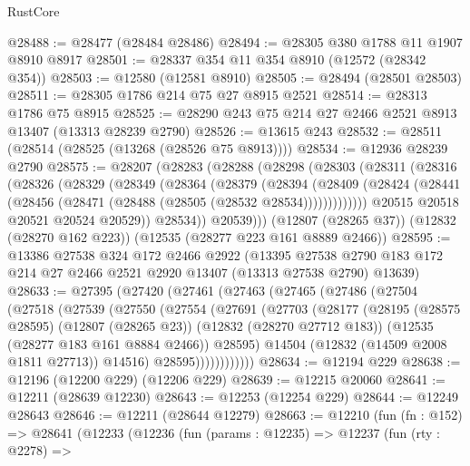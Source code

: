 \begin{lexlean}{RustCore}
\begin{coremodule}
@28488 := @28477 (@28484 @28486)
@28494 := @28305 @380 @1788 @11 @1907 @8910 @8917
@28501 := @28337 @354 @11 @354 @8910 (@12572 (@28342 @354))
@28503 := @12580 (@12581 @8910)
@28505 := @28494 (@28501 @28503)
@28511 := @28305 @1786 @214 @75 @27 @8915 @2521
@28514 := @28313 @1786 @75 @8915
@28525 := @28290 @243 @75 @214 @27 @2466 @2521 @8913 @13407 (@13313 @28239 @2790)
@28526 := @13615 @243
@28532 := @28511 (@28514 (@28525 (@13268 (@28526 @75 @8913))))
@28534 := @12936 @28239 @2790
@28575 := @28207
    (@28283
      (@28288
        (@28298
          (@28303
            (@28311
              (@28316
                (@28326
                  (@28329
                    (@28349
                      (@28364
                        (@28379
                          (@28394
                            (@28409
                              (@28424
                                (@28441 (@28456 (@28471 (@28488 (@28505 (@28532 @28534)))))))))))))
                  @20515
                  @20518
                  @20521
                  @20524
                  @20529))
              @28534))
          @20539)))
    (@12807 (@28265 @37))
    (@12832 (@28270 @162 @223))
    (@12535 (@28277 @223 @161 @8889 @2466))
@28595 := @13386
    @27538
    @324
    @172
    @2466
    @2922
    (@13395 @27538 @2790 @183 @172 @214 @27 @2466 @2521 @2920 @13407 (@13313 @27538 @2790) @13639)
@28633 := @27395
    (@27420
      (@27461
        (@27463
          (@27465
            (@27486
              (@27504
                (@27518
                  (@27539
                    (@27550
                      (@27554
                        (@27691
                          (@27703
                            (@28177
                              (@28195
                                (@28575 @28595)
                                (@12807 (@28265 @23))
                                (@12832 (@28270 @27712 @183))
                                (@12535 (@28277 @183 @161 @8884 @2466))
                                @28595)
                              @14504
                              (@12832 (@14509 @2008 @1811 @27713))
                              @14516)
                            @28595))))))))))))
@28634 := @12194 @229
@28638 := @12196 (@12200 @229) (@12206 @229)
@28639 := @12215 @20060
@28641 := @12211 (@28639 @12230)
@28643 := @12253 (@12254 @229)
@28644 := @12249 @28643
@28646 := @12211 (@28644 @12279)
@28663 := @12210
    (fun (fn : @152) =>
    @28641
      (@12233
        (@12236
          (fun (params : @12235) =>
          @12237
            (fun (rty : @2278) =>

\end{coremodule}
\end{lexlean}
